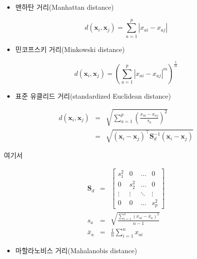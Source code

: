 \documentclass[]{book}
\providecommand{\tightlist}{%
  \setlength{\itemsep}{0pt}\setlength{\parskip}{0pt}}
\begin{document}
\begin{itemize}
\tightlist
\item
  맨하탄 거리(Manhattan distance)
\end{itemize}

\begin{equation*}
d(\mathbf{x}_i, \mathbf{x}_j) = \sum_{a = 1}^{p} \left| x_{ai} - x_{aj} \right|
\end{equation*}

\begin{itemize}
\tightlist
\item
  민코프스키 거리(Minkowski distance)
\end{itemize}

\begin{equation*}
d(\mathbf{x}_i, \mathbf{x}_j) = \left( \sum_{a = 1}^{p} \left| x_{ai} - x_{aj} \right|^m \right)^\frac{1}{m}
\end{equation*}

\begin{itemize}
\tightlist
\item
  표준 유클리드 거리(standardized Euclidean distance)
\end{itemize}

\begin{eqnarray*}
d(\mathbf{x}_i, \mathbf{x}_j) &=& \sqrt{\sum_{a = 1}^{p} \left(\frac{x_{ai} - x_{aj}}{s_a}\right)^2}\\
&=& \sqrt{(\mathbf{x}_i - \mathbf{x}_j)^\top \mathbf{S}_d^{-1} (\mathbf{x}_i - \mathbf{x}_j)}
\end{eqnarray*}

여기서

\begin{eqnarray*}
\mathbf{S}_d &=& \begin{bmatrix}
s_1^2 & 0 & \dots & 0\\
0 & s_2^2 & \dots & 0\\
\vdots & \vdots & \ddots & \vdots\\
0 & 0 & \dots & s_p^2
\end{bmatrix}\\
s_a &=& \sqrt{\frac{\sum_{i = 1}^{n} \left(x_{ai} - \bar{x}_a \right)^2}{n - 1}}\\
\bar{x}_a &=& \frac{1}{n} \sum_{i = 1}^{n} x_{ai}
\end{eqnarray*}

\begin{itemize}
\tightlist
\item
  마할라노비스 거리(Mahalanobis distance)
\end{itemize}
\end{document}

